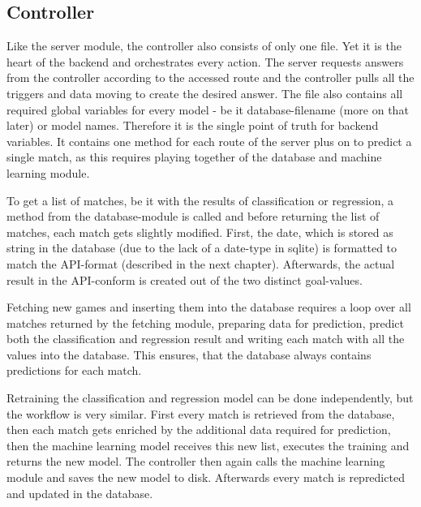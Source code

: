 \subsection{Controller}
Like the server module, the controller also consists of only one file. Yet it is the heart of the backend and orchestrates every action. The server requests answers from the controller according to the accessed route and the controller pulls all the triggers and data moving to create the desired answer. The file also contains all required global variables for every model - be it database-filename (more on that later) or model names. Therefore it is the single point of truth for backend variables. It contains one method for each route of the server plus on to predict a single match, as this requires playing together of the database and machine learning module.

To get a list of matches, be it with the results of classification or regression, a method from the database-module is called and before returning the list of matches, each match gets slightly modified. First, the date, which is stored as string in the database (due to the lack of a date-type in sqlite) is formatted to match the API-format (described in the next chapter). Afterwards, the actual result in the API-conform is created out of the two distinct goal-values.

Fetching new games and inserting them into the database requires a loop over all matches returned by the fetching module, preparing data for prediction, predict both the classification and regression result and writing each match with all the values into the database. This ensures, that the database always contains predictions for each match.

Retraining the classification and regression model can be done independently, but the workflow is very similar. First every match is retrieved from the database, then each match gets enriched by the additional data required for prediction, then the machine learning model receives this new list, executes the training and returns the new model. The controller then again calls the machine learning module and saves the new model to disk. Afterwards every match is repredicted and updated in the database.

